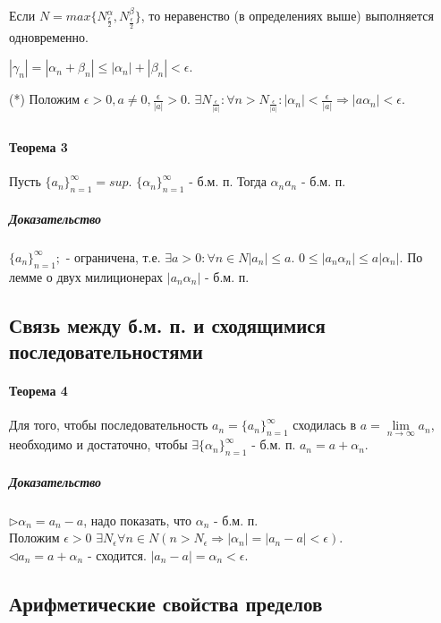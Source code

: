 \documentclass[10pt]{article}
\newcommand{\limninf}{\lim\limits_{n \to \infty}}
\newcommand{\seq}[2]{ \{#1_{#2}\}_{#2=1}^\infty}
\newcommand{\seqn}[1]{\seq{#1}{n}}
\begin{document}
			Если $N = max\{ N_{\frac{\epsilon}{2}}^\alpha,  N_{\frac{\epsilon}{2}}^\beta\}$, то неравенство (в определениях выше) выполняется одновременно.
			
			$|\gamma_n| = |\alpha_n + \beta_n| \le |\alpha_n| + |\beta_n| < \epsilon$.
			
			(*) Положим $\epsilon > 0, a \neq 0, \frac{\epsilon}{|a|} > 0$.
			$\exists N_{\frac{\epsilon}{|a|}} : \forall n > N_{\frac{\epsilon}{|a|}} : |\alpha_n| < \frac{\epsilon}{|a|} \Rightarrow |a\alpha_n| < \epsilon$.
		\subsection{}
			\paragraph{Теорема 3}
			Пусть $\seqn{a} = sup$. $\seqn{\alpha}$ - б.м. п. Тогда $\alpha_n a_n$ - б.м. п.
			\subparagraph{Доказательство}
			$\seqn{a};$ - ограничена, т.е. $\exists a > 0 : \forall n \in N |a_n| \le a$. $0 \le |a_n\alpha_n| \le a|\alpha_n|$. По лемме о двух милиционерах $|a_n\alpha_n|$ - б.м. п.
		\subsection{Связь между б.м. п. и сходящимися последовательностями}
			\paragraph{Теорема 4}
			Для того, чтобы последовательность $a_n = \seqn{a}$ сходилась в $a = \limninf a_n$, необходимо и достаточно, чтобы $\exists \seqn{\alpha}$ - б.м. п. $a_n = a + \alpha_n$.
			\subparagraph{Доказательство}
			$\rhd \alpha_n = a_n - a$, надо показать, что $\alpha_n$ - б.м. п.\\
			Положим $\epsilon > 0$ $\exists N_\epsilon \forall n \in N (n > N_\epsilon \Rightarrow |\alpha_n| = |a_n - a| < \epsilon)$.\\
			$\lhd a_n = a+\alpha_n$ - сходится. $|a_n - a| = \alpha_n < \epsilon$. 
		\subsection{Арифметические свойства пределов}
\end{document}
